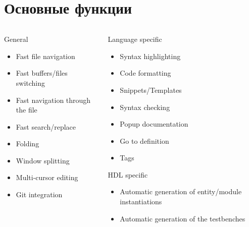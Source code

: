 \documentclass[aspectratio=169]{beamer}
\begin{document}
\section*{Основные функции}
\begin{frame}{\secname}
  \begin{columns}
    \begin{column}{0.5\textwidth}
  \begin{block}{General}
    \begin{itemize}
        \item Fast file navigation
        \item Fast buffers/files switching
        \item Fast navigation through the file
        \item Fast search/replace
        \item Folding
        \item Window splitting
        \item Multi-cursor editing
        \item Git integration
    \end{itemize}
  \end{block}
      
    \end{column}


    \begin{column}{0.5\textwidth}

      \begin{block}{Language specific}
        \begin{itemize}
          \item Syntax highlighting
          \item Code formatting
          \item Snippets/Templates
          \item Syntax checking
          \item Popup documentation
          \item Go to definition
          \item Tags
        \end{itemize}
      \end{block}
      \begin{block}{HDL specific}
        \begin{itemize}
          \item Automatic generation of entity/module instantiations
          \item Automatic generation of the testbenches
        \end{itemize}
      \end{block}
      
    \end{column}
  \end{columns}
    
\end{frame}
\end{document}
